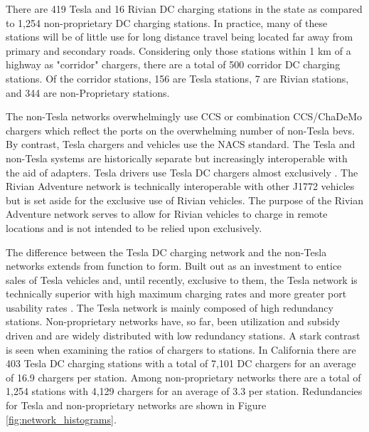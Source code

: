 \begin{multicols}{2}

There are 419 Tesla and 16 Rivian DC charging stations in the state as compared to 1,254 non-proprietary DC charging stations. In practice, many of these stations will be of little use for long distance travel being located far away from primary and secondary roads. Considering only those stations within 1 km of a highway as "corridor" chargers, there are a total of 500 corridor DC charging stations. Of the corridor stations, 156 are Tesla stations, 7 are Rivian stations, and 344 are non-Proprietary stations.

The non-Tesla networks overwhelmingly use CCS or combination CCS/ChaDeMo chargers which reflect the ports on the overwhelming number of non-Tesla \glspl{bev}. By contrast, Tesla chargers and vehicles use the NACS standard. The Tesla and non-Tesla systems are historically separate but increasingly interoperable with the aid of adapters. Tesla drivers use Tesla DC chargers almost exclusively \cite{Visaria_2022}. The Rivian Adventure network is technically interoperable with other J1772 vehicles but is set aside for the exclusive use of Rivian vehicles. The purpose of the Rivian Adventure network serves to allow for Rivian vehicles to charge in remote locations and is not intended to be relied upon exclusively.

The difference between the Tesla DC charging network and the non-Tesla networks extends from function to form. Built out as an investment to entice sales of Tesla vehicles and, until recently, exclusive to them, the Tesla network is technically superior with high maximum charging rates and more greater port usability rates \cite{Rempel_2023, Kozumplik_2022}. The Tesla network is mainly composed of high redundancy stations. Non-proprietary networks have, so far, been utilization and subsidy driven \cite{Gamage_2023} and are widely distributed with low redundancy stations. A stark contrast is seen when examining the ratios of chargers to stations. In California there are 403 Tesla DC charging stations with a total of 7,101 DC chargers for an average of 16.9 chargers per station. Among non-proprietary networks there are a total of 1,254 stations with 4,129 chargers for an average of 3.3 per station. Redundancies for Tesla and non-proprietary networks are shown in Figure \ref{fig:network_histograms}. 



\end{multicols}
